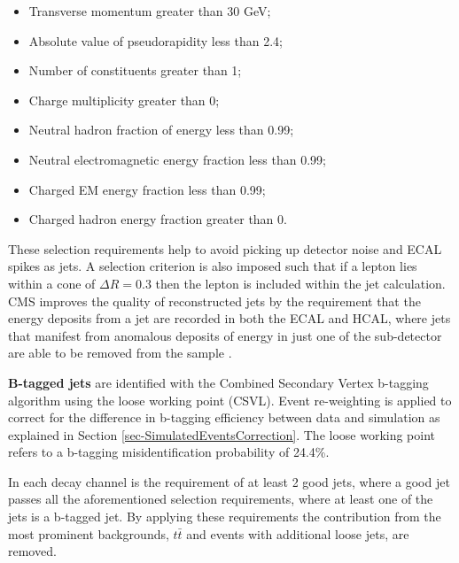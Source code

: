 \begin{itemize}
	\item Transverse momentum greater than 30 GeV;
	\item Absolute value of pseudorapidity less than 2.4;
	\item Number of constituents greater than 1;
	\item Charge multiplicity greater than 0;
	\item Neutral hadron fraction of energy less than 0.99;
	\item Neutral electromagnetic energy fraction less than 0.99;
	\item Charged EM energy fraction less than 0.99;
	\item Charged hadron energy fraction greater than 0.
\end{itemize}

These selection requirements help to avoid picking up detector noise and ECAL spikes as jets. A selection criterion is also imposed such that if a lepton lies within a cone of $\Delta R = 0.3$ then the lepton is included within the jet calculation. CMS improves the quality of reconstructed jets by the requirement that the energy deposits from a jet are recorded in both the ECAL and HCAL, where jets that manifest from anomalous deposits of energy in just one of the sub-detector are able to be removed from the sample \cite{CMS-PAS-JME-10-003}.

 \textbf{B-tagged jets} are identified with the Combined Secondary Vertex b-tagging algorithm using the loose working point (CSVL). Event re-weighting is applied to correct for the difference in b-tagging efficiency between data and simulation as explained in Section \ref{sec-SimulatedEventsCorrection}. The loose working point refers to a b-tagging misidentification probability of 24.4\%.

 In each decay channel is the requirement of at least 2 good jets, where a good jet passes all the aforementioned selection requirements, where at least one of the jets is a b-tagged jet. By applying these requirements the contribution from the most prominent backgrounds, $t\bar{t}$ and events with additional loose jets, are removed. 

